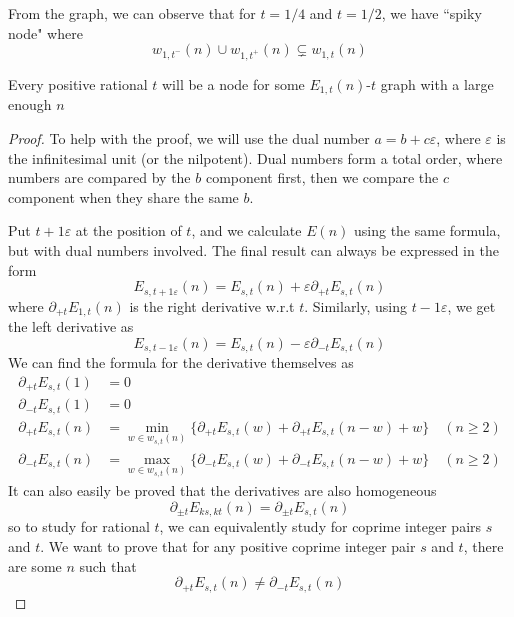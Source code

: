\documentclass[]{article}
\begin{document}
From the graph, we can observe that for $t = 1/4$ and $t = 1/2$, we have ``spiky node" where
\[
 w_{1,t^-}(n) \cup w_{1,t^+}(n)  \subsetneq w_{1,t}(n)
\]

\vspace{1cm}
\begin{lemma}[Node]
	Every positive rational $t$ will be a node for some $E_{1,t}(n)$-$t$ graph with a large enough $n$
\end{lemma}
\begin{proof}
	To help with the proof, we will use the dual number $a = b + c\varepsilon $, where $\varepsilon$ is the infinitesimal unit (or the nilpotent). Dual numbers form a total order, where numbers are compared by the $b$ component first, then we compare the $c$ component when they share the same $b$.

	Put $t + 1\varepsilon$ at the position of $t$, and we calculate $E(n)$ using the same formula, but with dual numbers involved. The final result can always be expressed in the form
	\[
	E_{s,t + 1\varepsilon}(n) = E_{s,t}(n) + \varepsilon \partial_{+t}E_{s,t}(n)
	\]
	where $\partial_{+t}E_{1,t}(n)  $ is the right derivative w.r.t $t$. Similarly, using $t - 1\varepsilon$, we get the left derivative as
	\[
	E_{s,t - 1\varepsilon}(n) = E_{s,t}(n) - \varepsilon \partial_{-t}E_{s,t}(n)
	\]
	We can find the formula for the derivative themselves as
	\begin{align*}
	\partial_{+t}E_{s,t}(1) &= 0\\
	 \partial_{-t}E_{s,t}(1) &= 0 \\
	 \partial_{+t}E_{s,t}(n) &= \min_{w\in w_{s,t}(n)}\{\partial_{+t}E_{s,t}(w) + \partial_{+t}E_{s,t}(n-w) + w\} \quad(n\geq 2)\\
	 \partial_{-t}E_{s,t}(n) &= \max_{w\in w_{s,t}(n)}\{\partial_{-t}E_{s,t}(w) + \partial_{-t}E_{s		,t}(n-w) + w\} \quad(n\geq 2)
	\end{align*}
	It can also easily be proved that the derivatives are also homogeneous
	\[
	\partial_{\pm t}E_{ks,kt}(n) = \partial_{\pm t}E_{s,t}(n)
	\]
	so to study for rational $t$, we can equivalently study for coprime integer pairs $s$ and $t$. We want to prove that for any positive coprime integer pair $s$ and $t$, there are some $n$ such that
	\[
	\partial_{+t}E_{s,t}(n) \neq \partial_{-t}E_{s,t}(n)
	\]



\end{proof}
\end{document}
